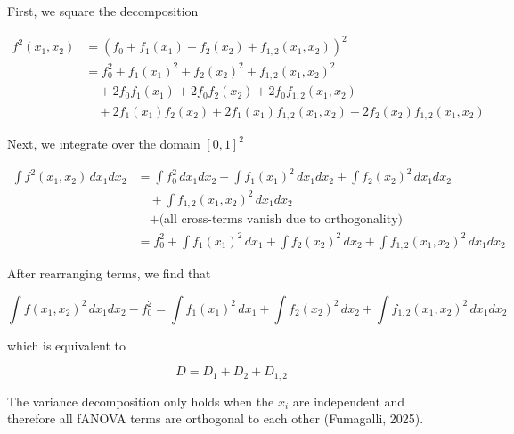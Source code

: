 \vspace{1em}

First, we square the decomposition

\begin{align*}
f^2(x_1, x_2) &= \left(f_0 + f_1(x_1) + f_2(x_2) + f_{1,2}(x_1, x_2)\right)^2 \\
&= f_0^2 + f_1(x_1)^2 + f_2(x_2)^2 + f_{1,2}(x_1, x_2)^2 \\
&\quad + 2f_0 f_1(x_1) + 2f_0 f_2(x_2) + 2f_0 f_{1,2}(x_1, x_2) \\
&\quad + 2f_1(x_1) f_2(x_2) + 2f_1(x_1) f_{1,2}(x_1, x_2) + 2f_2(x_2) f_{1,2}(x_1, x_2)
\end{align*}

\vspace{1em}

Next, we integrate over the domain \( [0,1]^2 \)

\begin{align*}
\int f^2(x_1, x_2) \, dx_1 dx_2 &= \int f_0^2 \, dx_1 dx_2 + \int f_1(x_1)^2 \, dx_1 dx_2 + \int f_2(x_2)^2 \, dx_1 dx_2 \\
&\quad + \int f_{1,2}(x_1, x_2)^2 \, dx_1 dx_2 \\
&\quad + \text{(all cross-terms vanish due to orthogonality)} \\
&= f_0^2 + \int f_1(x_1)^2 \, dx_1 + \int f_2(x_2)^2 \, dx_2 + \int f_{1,2}(x_1, x_2)^2 \, dx_1 dx_2
\end{align*}

\vspace{1em}

After rearranging terms, we find that

\[
\int f(x_1, x_2)^2 \, dx_1 dx_2 - f_0^2 = \int f_1(x_1)^2 \, dx_1 + \int f_2(x_2)^2 \, dx_2 + \int f_{1,2}(x_1, x_2)^2 \, dx_1 dx_2
\]

which is equivalent to 

\[
D = D_1 + D_2 + D_{1,2}
\]

The variance decomposition only holds when the $x_i$ are independent and therefore all fANOVA terms are orthogonal to each other (Fumagalli, 2025).




